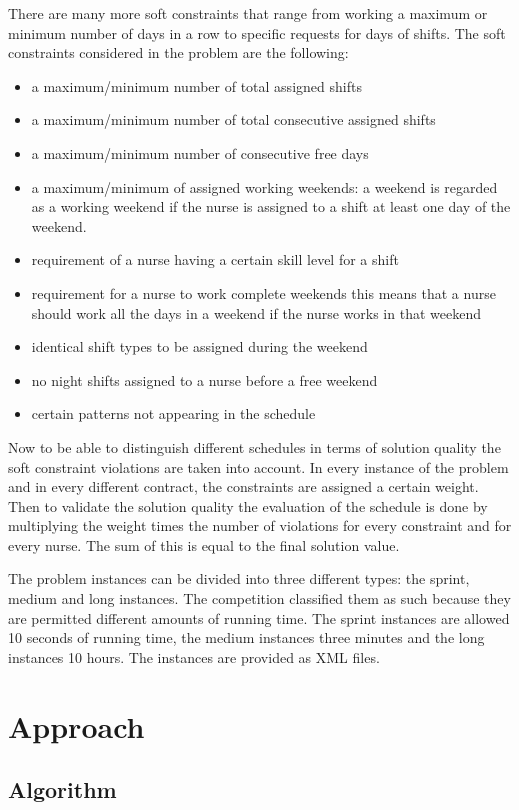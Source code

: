 \documentclass{article}
\begin{document}
There are many more soft constraints that range from working a maximum or minimum number of days in a row to specific requests for days of shifts.
The soft constraints considered in the problem are the following:
\begin{itemize}
	\item a maximum/minimum number of total assigned shifts
	\item a maximum/minimum number of total consecutive assigned shifts
	\item a maximum/minimum number of consecutive free days 
	\item a maximum/minimum of assigned working weekends:
	a weekend is regarded as a working weekend if the nurse is assigned to a shift at least one day of the weekend.
	\item requirement of a nurse having a certain skill level for a shift
	\item requirement for a nurse to work complete weekends
	this means that a nurse should work all the days in a weekend if the nurse works in that weekend
	\item identical shift types to be assigned during the weekend
	\item no night shifts assigned to a nurse before a free weekend
	\item certain patterns not appearing in the schedule
\end{itemize}

Now to be able to distinguish different schedules in terms of solution quality the soft constraint violations are taken into account.
In every instance of the problem and in every different contract, the constraints are assigned a certain weight.
Then to validate the solution quality the evaluation of the schedule is done by multiplying the weight times the number of violations for every constraint and for every nurse.
The sum of this is equal to the final solution value.

The problem instances can be divided into three different types: the sprint, medium and long instances.
The competition classified them as such because they are permitted different amounts of running time.
The sprint instances are allowed 10 seconds of running time, the medium instances three minutes and the long instances 10 hours.
The instances are provided as XML files.

\section{Approach}
\subsection{Algorithm}
\end{document}
